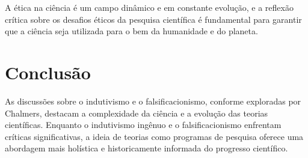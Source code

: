 \documentclass{article} %
\begin{document}
A ética na ciência é um campo dinâmico e em constante evolução, e a reflexão crítica sobre os desafios éticos da pesquisa científica é fundamental para garantir que a ciência seja utilizada para o bem da humanidade e do planeta.


\section{Conclusão}

As discussões sobre o indutivismo e o falsificacionismo, conforme exploradas por Chalmers, destacam a complexidade da ciência e a evolução das teorias científicas. Enquanto o indutivismo ingênuo e o falsificacionismo enfrentam críticas significativas, a ideia de teorias como programas de pesquisa oferece uma abordagem mais holística e historicamente informada do progresso científico.
\end{document}
